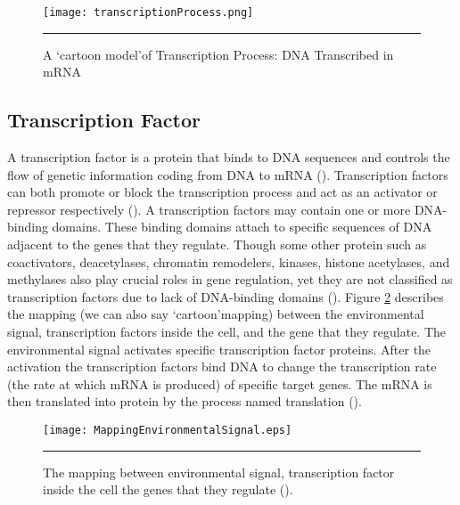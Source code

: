 \begin{figure}%
	\centering
		\texttt{[image: transcriptionProcess.png]}
		\rule{35em}{0.5pt}
	\caption{A \lq cartoon model\rq of Transcription Process: DNA Transcribed in mRNA}
	\label{fig:transcriptionProcess}
\end{figure}

\subsection{Transcription Factor}
A transcription factor is a protein that binds to DNA sequences and controls the flow of genetic information coding from DNA to mRNA (\cite{karin:1990, Latchman:1997}). Transcription factors can both promote or block the transcription process and act as an activator or repressor respectively (\cite{Lee:2000, Nikolov:1997, Roeder:1996}). A transcription factors may contain one or more DNA-binding domains. These binding domains attach to specific sequences of DNA adjacent to the genes that they regulate. Though some other protein such as coactivators, deacetylases, chromatin remodelers, kinases, histone acetylases, and methylases also play crucial roles in gene regulation, yet they are not classified as transcription factors due to lack of DNA-binding domains (\cite{Mitchell:1989, Ptashne:1997, Brivanlou:2002}). Figure \ref{fig:MappingEnvironmentalSignal} describes the mapping (we can also say \lq cartoon\rq mapping) between the environmental signal, transcription factors inside the cell, and the gene that they regulate. The environmental signal activates specific transcription factor proteins. After the activation the transcription factors bind DNA to change the transcription rate (the rate at which mRNA is produced) of specific target genes. The mRNA is then translated into protein by the process named translation (\cite{Alon:2006}). 

\begin{figure}%
	\centering
		\texttt{[image: MappingEnvironmentalSignal.eps]}
		\rule{35em}{0.5pt}
	\caption[The mapping between environmental signal, transcription factor inside the cell the genes that they regulate]{The mapping between environmental signal, transcription factor inside the cell the genes that they regulate (\cite{Alon:2006}).}
	\label{fig:MappingEnvironmentalSignal}
\end{figure}

